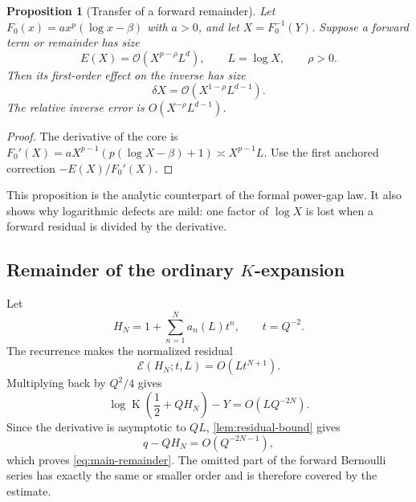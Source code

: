 \documentclass[11pt,oneside]{article}
\theoremstyle{plain}
\newtheorem{proposition}[theorem]{Proposition}
\theoremstyle{definition}
\theoremstyle{remark}
\newcommand{\Kfun}{\operatorname{K}}
\newcommand{\BigO}{\mathcal{O}}
\newcommand{\calE}{\mathcal{E}}
\begin{document}
\begin{proposition}[Transfer of a forward remainder]
\label{prop:error-transfer}
Let \(F_0(x)=a x^p(\log x-\beta)\) with \(a>0\), and let
\(X=F_0^{-1}(Y)\).  Suppose a forward term or remainder has size
\begin{equation}
 E(X)=\BigO\!\left(X^{p-\rho}L^d\right),
 \qquad L=\log X,
 \qquad \rho>0.
 \label{eq:forward-error-shape}
\end{equation}
Then its first-order effect on the inverse has size
\begin{equation}
 \delta X
 =\BigO\!\left(X^{1-\rho}L^{d-1}\right).
 \label{eq:inverse-error-shape}
\end{equation}
The relative inverse error is
\(O(X^{-\rho}L^{d-1})\).
\end{proposition}

\begin{proof}
The derivative of the core is
\(F_0'(X)=aX^{p-1}(p(\log X-\beta)+1)\asymp X^{p-1}L\).
Use the first anchored correction \(-E(X)/F_0'(X)\).
\end{proof}

This proposition is the analytic counterpart of the formal power-gap law.  It
also shows why logarithmic defects are mild: one factor of \(\log X\) is lost
when a forward residual is divided by the derivative.

\subsection{Remainder of the ordinary \texorpdfstring{\(K\)-expansion}{K-expansion}}

Let
\begin{equation}
 H_N=1+\sum_{n=1}^{N}a_n(L)t^n,
 \qquad t=Q^{-2}.
 \label{eq:HN-ordinary}
\end{equation}
The recurrence makes the normalized residual
\begin{equation}
 \calE(H_N;t,L)=O(Lt^{N+1}).
 \label{eq:E-ordinary-order}
\end{equation}
Multiplying back by \(Q^2/4\) gives
\begin{equation}
 \log\Kfun\!\left(\frac12+QH_N\right)-Y
 =O(LQ^{-2N}).
 \label{eq:ordinary-forward-residual}
\end{equation}
Since the derivative is asymptotic to \(QL\),
\cref{lem:residual-bound} gives
\begin{equation}
 q-QH_N=O(Q^{-2N-1}),
 \label{eq:ordinary-inverse-error-proof}
\end{equation}
which proves \eqref{eq:main-remainder}.  The omitted part of the forward
Bernoulli series has exactly the same or smaller order and is therefore covered
by the estimate.
\end{document}
